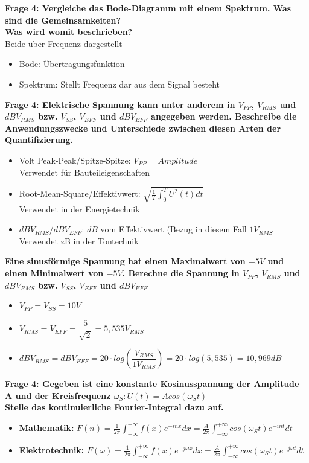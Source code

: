 \documentclass[11pt,a4paper]{scrartcl}
\begin{document}
\textbf{Frage 4: Vergleiche das Bode-Diagramm mit einem Spektrum. Was sind die Gemeinsamkeiten?}\\
\textbf{Was wird womit beschrieben?}\\
Beide über Frequenz dargestellt
\begin{itemize}
	\item Bode: Übertragungsfunktion
	\item Spektrum: Stellt Frequenz dar aus dem Signal besteht
\end{itemize}

\textbf{Frage 4: Elektrische Spannung kann unter anderem in $V_{PP}$, $V_{RMS}$ und $dBV_{RMS}$ bzw. $V_{SS}$, $V_{EFF}$ und $dBV_{EFF}$ angegeben werden. Beschreibe die Anwendungszwecke und Unterschiede zwischen diesen Arten der Quantifizierung.}\\
\begin{itemize}
	\item Volt Peak-Peak/Spitze-Spitze: $V_{PP}=Amplitude$ \\Verwendet für Bauteileigenschaften
	\item Root-Mean-Square/Effektivwert: $\sqrt{\frac{1}{T}\int_0^TU^2(t)dt}$ \\Verwendet in der Energietechnik
	\item $dBV_{RMS}$/$dBV_{EFF}$: $dB$ vom Effektivwert (Bezug in diesem Fall $1V_{RMS}$ \\Verwendet zB in der Tontechnik
\end{itemize}
\textbf{Eine sinusförmige Spannung hat einen Maximalwert von $+5V$ und einen
Minimalwert von $-5V$. Berechne die Spannung in $V_{PP}$, $V_{RMS}$ und $dBV_{RMS}$ bzw. $V_{SS}$, $V_{EFF}$ und $dBV_{EFF}$}\\
\begin{itemize}
	\item $V_{PP}=V_{SS}=10V$
	\item $V_{RMS}=V_{EFF}=\dfrac{5}{\sqrt{2}}=5,535V_{RMS}$
	\item $dBV_{RMS}=dBV_{EFF}=20\cdot log(\dfrac{V_{RMS}}{1V_{RMS}})=20\cdot log(5,535)=10,969dB$
\end{itemize}

\textbf{Frage 4: Gegeben ist eine konstante Kosinusspannung der Amplitude A und der Kreisfrequenz $\omega_S : U(t) = A cos (\omega_St)$\\Stelle das kontinuierliche Fourier-Integral dazu auf. }
\begin{itemize}
	\item \textbf{Mathematik:} $F(n)=\frac{1}{2\pi}\int_{-\infty}^{+\infty}f(x)e^{-inx}dx=\frac{A}{2\pi}\int_{-\infty}^{+\infty}cos(\omega_St)e^{-int}dt$
	\item \textbf{Elektrotechnik:} $F(\omega)=\frac{1}{2\pi}\int_{-\infty}^{+\infty}f(x)e^{-j\omega x}dx=\frac{A}{2\pi}\int_{-\infty}^{+\infty}cos(\omega_St)e^{-j \omega t}dt$
\end{itemize}
\end{document}
